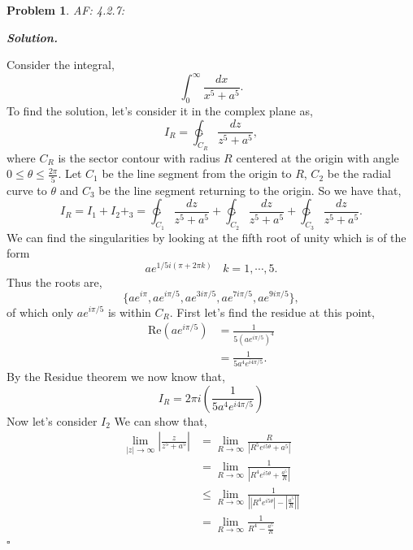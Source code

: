 \documentclass[12pt]{report}
\newtheorem{problem}{Problem}
\newenvironment{solution}[1][\it{Solution}]{\textbf{#1. } }{$\square$}
\def\ointcc{{\ointctrclockwise}}
\begin{document}



\begin{problem}
    AF: 4.2.7: 
\end{problem}

\begin{solution}

    \noindent
    Consider the integral,
    \[
        \int_0^\infty \frac{dx}{x^5 + a^5}.
    \]
    To find the solution, let's consider it in the complex plane as,
    \[
        I_R = \ointcc_{C_R} \frac{dz}{z^5 + a^5},
    \]
    where $C_R$ is the sector contour with radius $R$ centered at the origin with angle $0 \leq \theta \leq \frac{2\pi}{5}$. Let $C_1$ be the line segment from the origin to $R$, $C_2$ be the radial curve to $\theta$ and $C_3$ be the line segment returning to the origin. So we have that,
    \[ I_R = I_1 + I_2 + _3 = \ointcc_{C_1} \frac{dz}{z^5 + a^5} + \ointcc_{C_2} \frac{dz}{z^5 + a^5} + \ointcc_{C_3} \frac{dz}{z^5 + a^5}.\]
    We can find the singularities by looking at the fifth root of unity which is of the form
    \[ ae^{1/5 i(\pi + 2\pi k)} ~~~~ k=1,\cdots,5.\]
    Thus the roots are,
    \[ \{ae^{i\pi},ae^{i\pi/5}, ae^{3i\pi/5},ae^{7i\pi/5},ae^{9i\pi/5}\},\]
    of which only $ae^{i\pi/5}$ is within $C_R$. First let's find the residue at this point,
    \begin{align*}
        \text{Re}(ae^{i\pi/5}) &= \frac{1}{5(ae^{i\pi/5})^4}\\
        &= \frac{1}{5a^4e^{i4\pi/5}}.
    \end{align*}
    By the Residue theorem we now know that,
    \[ I_R = 2\pi i \left( \frac{1}{5a^4e^{i4\pi/5}} \right)\]
    Now let's consider $I_2$ We can show that,
    \begin{align*}
        \lim_{|z| \rightarrow \infty} \left| \frac{z}{z^5 + a^5}\right| &= \lim_{R \rightarrow \infty} \frac{R}{\left| R^5e^{i5\theta} + a^5\right|}\\
        &= \lim_{R \rightarrow \infty} \frac{1}{\left| R^4e^{i5\theta} + \frac{a^5}{R}\right|}\\
        &\leq \lim_{R \rightarrow \infty} \frac{1}{\left| |R^4e^{i5\theta}| - |\frac{a^5}{R}| \right|}\\
        &= \lim_{R \rightarrow \infty} \frac{1}{R^4 - \frac{a^5}{R}}\\

\end{align*}
\end{solution}
\end{document}

